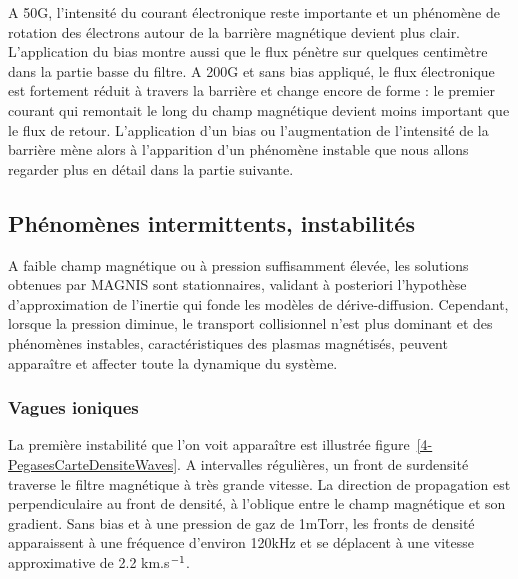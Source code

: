 \begin{refsection}
A 50G, l'intensité du courant électronique reste importante et un phénomène de
rotation des électrons autour de la barrière magnétique devient plus clair.
L'application du bias montre aussi que le flux pénètre sur quelques centimètre
dans la partie basse du filtre. A 200G et sans bias appliqué, le flux
électronique est fortement réduit à travers la barrière et change encore de
forme : le premier courant qui remontait le long du champ magnétique devient
moins important que le flux de retour. L'application d'un bias ou l'augmentation
de l'intensité de la barrière mène alors à l'apparition d'un phénomène instable
que nous allons regarder plus en détail dans la partie suivante.

\subsection{Phénomènes intermittents, instabilités}
A faible champ magnétique ou à pression suffisamment élevée, les solutions
obtenues par MAGNIS sont stationnaires, validant à posteriori l'hypothèse
d'approximation de l'inertie qui fonde les modèles de dérive-diffusion.
Cependant, lorsque la pression diminue, le transport collisionnel n'est plus
dominant et des phénomènes instables, caractéristiques des plasmas
magnétisés, peuvent apparaître et affecter toute la dynamique du système. 
 
	\subsubsection{Vagues ioniques}
La première instabilité que l'on voit apparaître est illustrée
figure~\ref{4-PegasesCarteDensiteWaves}. A intervalles régulières, un front
de surdensité traverse le filtre magnétique à très grande vitesse. La direction
 de propagation est perpendiculaire au front de densité, à l'oblique entre le
 champ magnétique et son gradient. Sans bias et à une pression de gaz de 1mTorr,
 les fronts de densité apparaissent à une fréquence d'environ 120kHz et se
 déplacent à une vitesse approximative de 2.2 km.s$^{{-1}}$. 
 

\end{refsection}
